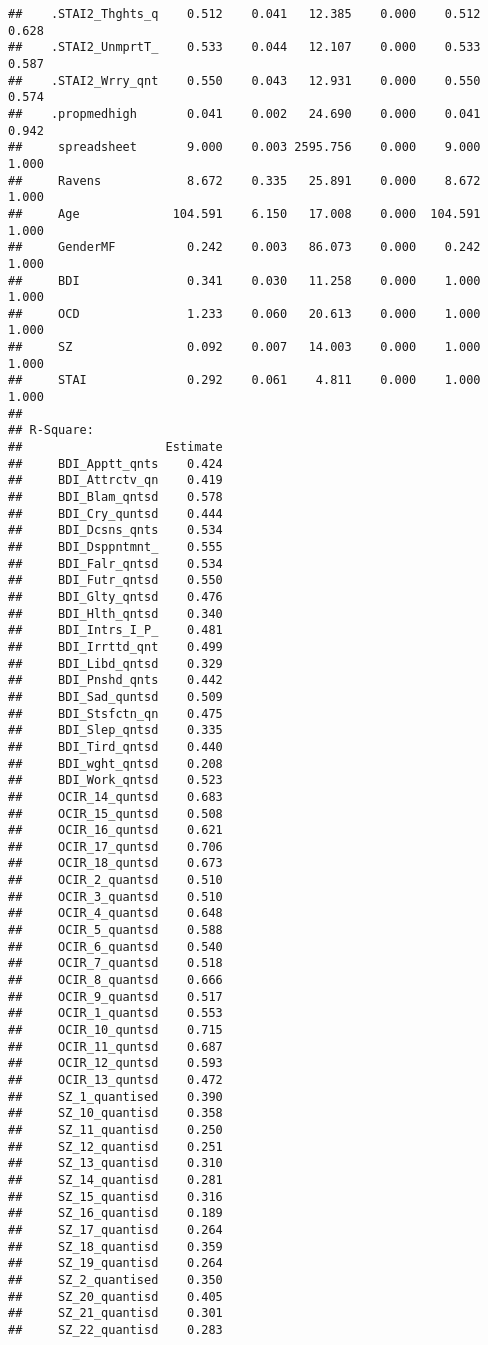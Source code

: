 \documentclass[]{article}
\begin{document}
\begin{verbatim}
##    .STAI2_Thghts_q    0.512    0.041   12.385    0.000    0.512    0.628
##    .STAI2_UnmprtT_    0.533    0.044   12.107    0.000    0.533    0.587
##    .STAI2_Wrry_qnt    0.550    0.043   12.931    0.000    0.550    0.574
##    .propmedhigh       0.041    0.002   24.690    0.000    0.041    0.942
##     spreadsheet       9.000    0.003 2595.756    0.000    9.000    1.000
##     Ravens            8.672    0.335   25.891    0.000    8.672    1.000
##     Age             104.591    6.150   17.008    0.000  104.591    1.000
##     GenderMF          0.242    0.003   86.073    0.000    0.242    1.000
##     BDI               0.341    0.030   11.258    0.000    1.000    1.000
##     OCD               1.233    0.060   20.613    0.000    1.000    1.000
##     SZ                0.092    0.007   14.003    0.000    1.000    1.000
##     STAI              0.292    0.061    4.811    0.000    1.000    1.000
## 
## R-Square:
##                    Estimate
##     BDI_Apptt_qnts    0.424
##     BDI_Attrctv_qn    0.419
##     BDI_Blam_qntsd    0.578
##     BDI_Cry_quntsd    0.444
##     BDI_Dcsns_qnts    0.534
##     BDI_Dsppntmnt_    0.555
##     BDI_Falr_qntsd    0.534
##     BDI_Futr_qntsd    0.550
##     BDI_Glty_qntsd    0.476
##     BDI_Hlth_qntsd    0.340
##     BDI_Intrs_I_P_    0.481
##     BDI_Irrttd_qnt    0.499
##     BDI_Libd_qntsd    0.329
##     BDI_Pnshd_qnts    0.442
##     BDI_Sad_quntsd    0.509
##     BDI_Stsfctn_qn    0.475
##     BDI_Slep_qntsd    0.335
##     BDI_Tird_qntsd    0.440
##     BDI_wght_qntsd    0.208
##     BDI_Work_qntsd    0.523
##     OCIR_14_quntsd    0.683
##     OCIR_15_quntsd    0.508
##     OCIR_16_quntsd    0.621
##     OCIR_17_quntsd    0.706
##     OCIR_18_quntsd    0.673
##     OCIR_2_quantsd    0.510
##     OCIR_3_quantsd    0.510
##     OCIR_4_quantsd    0.648
##     OCIR_5_quantsd    0.588
##     OCIR_6_quantsd    0.540
##     OCIR_7_quantsd    0.518
##     OCIR_8_quantsd    0.666
##     OCIR_9_quantsd    0.517
##     OCIR_1_quantsd    0.553
##     OCIR_10_quntsd    0.715
##     OCIR_11_quntsd    0.687
##     OCIR_12_quntsd    0.593
##     OCIR_13_quntsd    0.472
##     SZ_1_quantised    0.390
##     SZ_10_quantisd    0.358
##     SZ_11_quantisd    0.250
##     SZ_12_quantisd    0.251
##     SZ_13_quantisd    0.310
##     SZ_14_quantisd    0.281
##     SZ_15_quantisd    0.316
##     SZ_16_quantisd    0.189
##     SZ_17_quantisd    0.264
##     SZ_18_quantisd    0.359
##     SZ_19_quantisd    0.264
##     SZ_2_quantised    0.350
##     SZ_20_quantisd    0.405
##     SZ_21_quantisd    0.301
##     SZ_22_quantisd    0.283

\end{verbatim}
\end{document}
